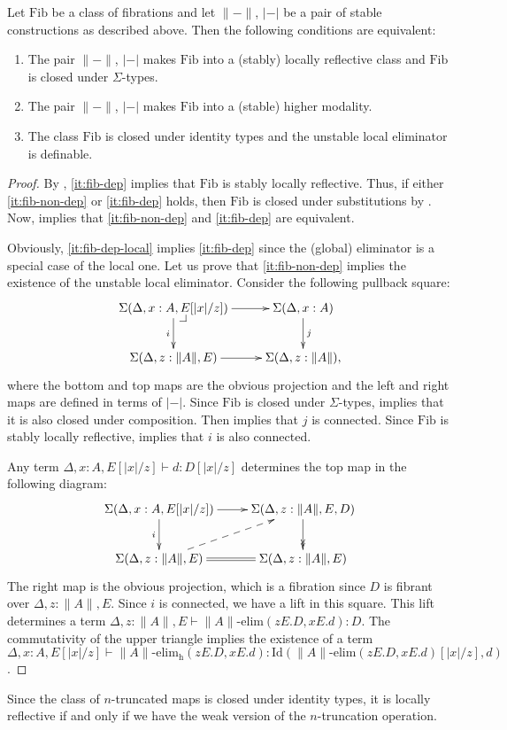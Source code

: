 \documentclass[reqno]{amsart}
\makeatletter
\theoremstyle{definition}
\theoremstyle{remark}
\newcommand{\fs}[1]{\mathrm{#1}}
\newcommand{\Id}{\fs{Id}}
\newcommand{\Fib}{\fs{Fib}}
\numberwithin{figure}{section}
\newcommand{\pb}[1][dr]{\save*!/#1-1.2pc/#1:(-1,1)@^{|-}\restore}
\makeatother
\begin{document}
\begin{prop}
Let $\Fib$ be a class of fibrations and let $\| - \|$, $| - |$ be a pair of stable constructions as described above.
Then the following conditions are equivalent:
\begin{enumerate}
\item \label{it:fib-non-dep} The pair $\| - \|$, $| - |$ makes $\Fib$ into a (stably) locally reflective class and $\Fib$ is closed under $\Sigma$-types.
\item \label{it:fib-dep} The pair $\| - \|$, $| - |$ makes $\Fib$ into a (stable) higher modality.
\item \label{it:fib-dep-local} The class $\Fib$ is closed under identity types and the unstable local eliminator is definable.
\end{enumerate}
\end{prop}
\begin{proof}
By , \eqref{it:fib-dep} implies that $\Fib$ is stably locally reflective.
Thus, if either \eqref{it:fib-non-dep} or \eqref{it:fib-dep} holds, then $\Fib$ is closed under substitutions by .
Now,  implies that \eqref{it:fib-non-dep} and \eqref{it:fib-dep} are equivalent.

Obviously, \eqref{it:fib-dep-local} implies \eqref{it:fib-dep} since the (global) eliminator is a special case of the local one.
Let us prove that \eqref{it:fib-non-dep} implies the existence of the unstable local eliminator.
Consider the following pullback square:
\[ \xymatrix{ \Sigma(\Delta, x : A, E[|x|/z]) \ar[r] \ar[d]_i \pb   & \Sigma(\Delta, x : A) \ar[d]^j \\
              \Sigma(\Delta, z : \| A \|, E) \ar[r]                 & \Sigma(\Delta, z : \| A \|),
            } \]
where the bottom and top maps are the obvious projection and the left and right maps are defined in terms of $| - |$.
Since $\Fib$ is closed under $\Sigma$-types,  implies that it is also closed under composition.
Then  implies that $j$ is connected.
Since $\Fib$ is stably locally reflective,  implies that $i$ is also connected.

Any term $\Delta, x : A, E[|x|/z] \vdash d : D[|x|/z]$ determines the top map in the following diagram:
\[ \xymatrix{ \Sigma(\Delta, x : A, E[|x|/z]) \ar[r] \ar[d]_i           & \Sigma(\Delta, z : \| A \|, E, D) \ar@{->>}[d] \\
              \Sigma(\Delta, z : \| A \|, E) \ar@{-->}[ur] \ar@{=}[r]   & \Sigma(\Delta, z : \| A \|, E)
            } \]
The right map is the obvious projection, which is a fibration since $D$ is fibrant over $\Delta, z : \| A \|, E$.
Since $i$ is connected, we have a lift in this square.
This lift determines a term $\Delta, z : \| A \|, E \vdash \| A \|\text{-}\fs{elim}(z E. D, x E. d) : D$.
The commutativity of the upper triangle implies the existence of a term $\Delta, x : A, E[|x|/z] \vdash \| A \|\text{-}\fs{elim_h}(z E. D, x E .d) : \Id(\| A \|\text{-}\fs{elim}(z E. D, x E. d)[|x|/z],d)$.
\end{proof}

\begin{example}
Since the class of $n$-truncated maps is closed under identity types, it is locally reflective if and only if we have the weak version of the $n$-truncation operation.
\end{example}



\end{document}
